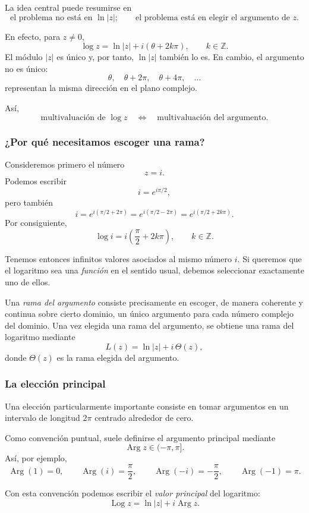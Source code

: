 \documentclass[12pt]{article}
\theoremstyle{definition}
\theoremstyle{remark}
\begin{document}
La idea central puede resumirse en
\[
\boxed{
\text{el problema no está en }\ln|z|;
\qquad
\text{el problema está en elegir el argumento de }z.
}
\]

En efecto, para $z\neq0$,
\[
\log z=\ln|z|+i(\theta+2k\pi),\qquad k\in\mathbb Z.
\]
El módulo $|z|$ es único y, por tanto, $\ln|z|$ también lo es. En cambio,
el argumento no es único:
\[
\theta,\quad\theta+2\pi,\quad\theta+4\pi,\quad\ldots
\]
representan la misma dirección en el plano complejo.

Así,
\[
\boxed{
\text{multivaluación de }\log z
\quad\Longleftrightarrow\quad
\text{multivaluación del argumento}.
}
\]

\subsubsection{¿Por qué necesitamos escoger una rama?}

Consideremos primero el número
\[
z=i.
\]
Podemos escribir
\[
i=e^{i\pi/2},
\]
pero también
\[
i=e^{i(\pi/2+2\pi)}
=e^{i(\pi/2-2\pi)}
=e^{i(\pi/2+2k\pi)}.
\]
Por consiguiente,
\[
\log i
=
i\left(\frac{\pi}{2}+2k\pi\right),
\qquad k\in\mathbb Z.
\]

Tenemos entonces infinitos valores asociados al mismo número $i$. Si queremos
que el logaritmo sea una \emph{función} en el sentido usual, debemos seleccionar
exactamente uno de ellos.

Una \emph{rama del argumento} consiste precisamente en escoger, de manera
coherente y continua sobre cierto dominio, un único argumento para cada número
complejo del dominio. Una vez elegida una rama del argumento, se obtiene una
rama del logaritmo mediante
\[
L(z)=\ln|z|+i\,\Theta(z),
\]
donde $\Theta(z)$ es la rama elegida del argumento.

\subsubsection{La elección principal}

Una elección particularmente importante consiste en tomar argumentos en un
intervalo de longitud $2\pi$ centrado alrededor de cero.

Como convención puntual, suele definirse el argumento principal mediante
\[
\operatorname{Arg}z\in(-\pi,\pi].
\]
Así, por ejemplo,
\[
\operatorname{Arg}(1)=0,\qquad
\operatorname{Arg}(i)=\frac{\pi}{2},\qquad
\operatorname{Arg}(-i)=-\frac{\pi}{2},\qquad
\operatorname{Arg}(-1)=\pi.
\]

Con esta convención podemos escribir el \emph{valor principal} del logaritmo:
\[
\boxed{
\operatorname{Log}z
=
\ln|z|+i\operatorname{Arg}z.
}
\]
\end{document}
